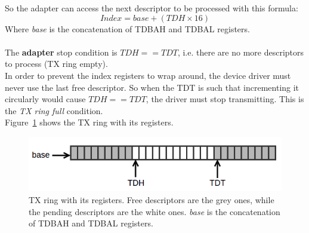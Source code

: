 \documentclass[a4paper, 12pt, titlepage]{report}
\begin{document}
So the adapter can access the next descriptor to be processed with this formula:
$$Index = base + (TDH \times 16)$$
Where \textit{base} is the concatenation of TDBAH and TDBAL registers.
\\
\\
The \textbf{adapter} stop condition is \begin{math}TDH == TDT \end{math}, i.e. there are no more descriptors to process (TX ring empty).
\\
In order to prevent the index registers to wrap around, the device driver must never use the last free descriptor. So when the TDT is such that incrementing it circularly would cause \begin{math}TDH == TDT \end{math}, the driver must stop transmitting. This is the \textit{TX ring full} condition.
\\
Figure~\ref{img:tx_ring} shows the TX ring with its registers.
\begin{figure}[!h] \label{img:tx_ring}
	\centering
	\includegraphics[scale=0.6]{img/tx_ring.png}
	\caption{TX ring with its registers. Free descriptors are the grey ones, while the pending descriptors are the white ones. \textit{base} is the concatenation of TDBAH and TDBAL registers.}
\end{figure}
\end{document}

